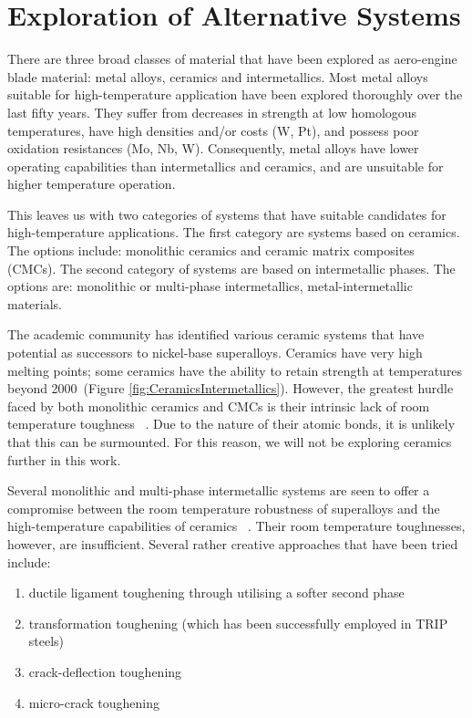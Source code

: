 \chapter{Exploration of Alternative Systems}

There are three broad classes of material that have been explored as aero-engine blade material: metal alloys, ceramics and intermetallics.  Most metal alloys suitable for high-temperature application have been explored thoroughly over the last fifty years.  They suffer from decreases in strength at low homologous temperatures, have high densities and/or costs (W, Pt), and possess poor oxidation resistances (Mo, Nb, W).  Consequently, metal alloys have lower operating capabilities than intermetallics and ceramics, and are unsuitable for higher temperature operation.  

This leaves us with two categories of systems that have suitable candidates for high-temperature applications.  The first category are systems based on ceramics.  The options include: monolithic ceramics and ceramic matrix composites (CMCs).  The second category of systems are based on intermetallic phases.  The options are: monolithic or multi-phase intermetallics, metal-intermetallic materials. 

The academic community has identified various ceramic systems that have potential as successors to nickel-base superalloys.  Ceramics have very high melting points; some ceramics have the ability to retain strength at temperatures beyond 2000\celsius\ (Figure \ref{fig:CeramicsIntermetallics}).  However, the greatest hurdle faced by both monolithic ceramics and CMCs is their intrinsic lack of room temperature toughness ~\cite{evans80}.  Due to the nature of their atomic bonds, it is unlikely that this can be surmounted.  For this reason, we will not be exploring ceramics further in this work.

Several monolithic and multi-phase intermetallic systems are seen to offer a compromise between the room temperature robustness of superalloys and the high-temperature capabilities of ceramics ~\cite{nathal92, balsone01}.  Their room temperature toughnesses, however, are insufficient.  Several rather creative approaches that have been tried include:

\begin{enumerate}

\item ductile ligament toughening through utilising a softer second phase ~\cite{flinn89}
\item transformation toughening (which has been successfully employed in TRIP steels) ~\cite{evans86}
\item crack-deflection toughening ~\cite{strum94}
\item micro-crack toughening ~\cite{kumar91}
\end{enumerate}

